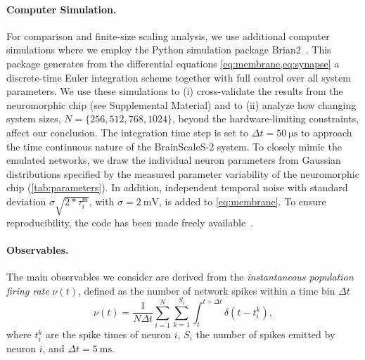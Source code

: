 \paragraph{Computer Simulation.}
\label{sec:simulation}
For comparison and finite-size scaling analysis, we use additional computer simulations where we employ the Python simulation package Brian2~\cite{goodman_brian_2009}.
This package generates from the differential equations \cref{eq:membrane,eq:synapse} a discrete-time Euler integration scheme together with full control over all system parameters.
We use these simulations to (i) cross-validate the results from the neuromorphic chip (see Supplemental Material) and to (ii) analyze how changing system sizes, $N=\{256,512,768,1024\}$, beyond the hardware-limiting constraints, affect our conclusion.
The integration time step is set to $\Delta t = \SI{50}{\micro\second}$ to approach the time continuous nature of the BrainScaleS-2 system.
To closely mimic the emulated networks, we draw the individual neuron parameters from Gaussian distributions specified by the measured parameter variability of the neuromorphic chip (\cref{tab:parameters}).
In addition, independent temporal noise with standard deviation $\sigma \sqrt{2*\tau^\mathrm{m}_i}$, with $\sigma = \SI{2}{\milli\volt}$, is added to \cref{eq:membrane}.
To ensure reproducibility, the code has been made freely available~\cite{noauthor_benjamincramerneuromorphic-bistability_nodate}.


\paragraph{Observables.}
\label{sec:observables}
The main observables we consider are derived from the \textit{instantaneous population firing rate} $\nu(t)$, defined as the number of network spikes within a time bin $\Delta t$
\begin{equation}
	\nu(t)=\frac{1}{N\Delta t}\sum_{i=1}^N \sum_{k=1}^{S_i}\int_t^{t+\Delta t}\delta(t-t_i^k),
\end{equation}
where $t_i^k$ are the spike times of neuron $i$, $S_i$ the number of spikes emitted by neuron $i$, and $\Delta t=\SI{5}{\milli\second}$.

